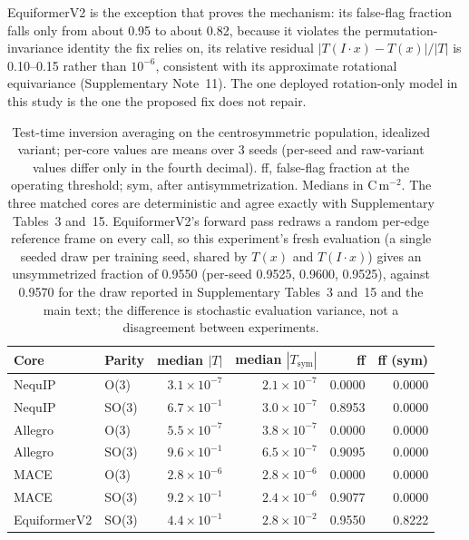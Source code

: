 EquiformerV2 is the exception that proves the mechanism: its false-flag fraction falls only from about 0.95 to about 0.82, because it violates the permutation-invariance identity the fix relies on, its relative residual $|T(I\!\cdot\!x) - T(x)|/|T|$ is 0.10--0.15 rather than $10^{-6}$, consistent with its approximate rotational equivariance (Supplementary Note~11). The one deployed rotation-only model in this study is the one the proposed fix does not repair.

\begin{table}[htbp]
\centering
\caption{Test-time inversion averaging on the centrosymmetric population, idealized variant; per-core values are means over 3 seeds (per-seed and raw-variant values differ only in the fourth decimal). ff, false-flag fraction at the operating threshold; sym, after antisymmetrization. Medians in C\,m$^{-2}$. The three matched cores are deterministic and agree exactly with Supplementary Tables~3 and~15. EquiformerV2's forward pass redraws a random per-edge reference frame on every call, so this experiment's fresh evaluation (a single seeded draw per training seed, shared by $T(x)$ and $T(I\!\cdot\!x)$) gives an unsymmetrized fraction of 0.9550 (per-seed 0.9525, 0.9600, 0.9525), against 0.9570 for the draw reported in Supplementary Tables~3 and~15 and the main text; the difference is stochastic evaluation variance, not a disagreement between experiments.}
\label{stab:e4}
\scriptsize
\begin{tabular}{llrrrr}
\toprule
Core & Parity & median $|T|$ & median $|T_{\mathrm{sym}}|$ & ff & ff (sym) \\
\midrule
NequIP & O(3) & $3.1\times10^{-7}$ & $2.1\times10^{-7}$ & 0.0000 & 0.0000 \\
NequIP & SO(3) & $6.7\times10^{-1}$ & $3.0\times10^{-7}$ & 0.8953 & 0.0000 \\
Allegro & O(3) & $5.5\times10^{-7}$ & $3.8\times10^{-7}$ & 0.0000 & 0.0000 \\
Allegro & SO(3) & $9.6\times10^{-1}$ & $6.5\times10^{-7}$ & 0.9095 & 0.0000 \\
MACE & O(3) & $2.8\times10^{-6}$ & $2.8\times10^{-6}$ & 0.0000 & 0.0000 \\
MACE & SO(3) & $9.2\times10^{-1}$ & $2.4\times10^{-6}$ & 0.9077 & 0.0000 \\
EquiformerV2 & SO(3) & $4.4\times10^{-1}$ & $2.8\times10^{-2}$ & 0.9550 & 0.8222 \\
\bottomrule
\end{tabular}
\end{table}

